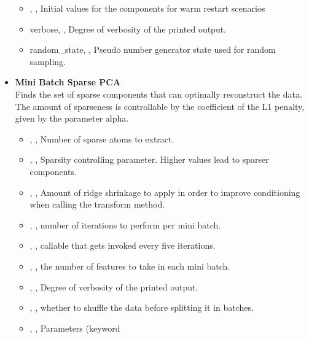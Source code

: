 \begin{itemize}
\begin{itemize}
		\item {}, , Initial values for the components for warm restart scenarios
		\item{verbose}, , Degree of verbosity of the
		 printed output. 
		\item{random\_state}, , Pseudo
		number generator state used for random sampling. 
	\end{itemize}
	\item \textbf{Mini Batch Sparse PCA} \\
	Finds the set of sparse components that can optimally reconstruct the data. The amount
	 of sparseness is controllable by the coefficient of the L1 penalty, given by the
	parameter alpha.
	\begin{itemize}
		\item {}, , Number of
		 sparse atoms to extract. 
		\item {}, , Sparsity controlling
		parameter. Higher values lead to sparser components. 
		\item {}, , Amount of ridge
		 shrinkage to apply in order to improve conditioning when calling the transform
		 method. 
		\item {}, , number of iterations
		to perform per mini batch. 
		\item {}, , callable that
		gets invoked every five iterations. 
		\item {}, , the number of
		features to take in each mini batch. 
		\item {}, , Degree of verbosity
		 of the printed output. 
		\item {}, , whether to shuffle
		the data before splitting it in batches. 
		\item {}, , Parameters (keyword

\end{itemize}
\end{itemize}
